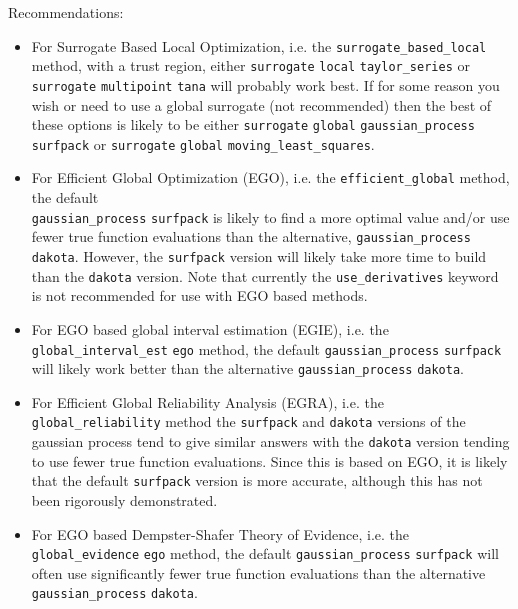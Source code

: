 \newpage
{\large Recommendations:}
\begin{itemize}
\item For Surrogate Based Local Optimization, i.e. the 
      \texttt{surrogate\_based\_local} method, with a trust region, either
      \texttt{surrogate} \texttt{local} \texttt{taylor\_series} or
      \texttt{surrogate} \texttt{multipoint} \texttt{tana} will probably 
      work best.  If for some reason you wish or need to use a global 
      surrogate (not recommended) then the best of these options is likely 
      to be either 
      \texttt{surrogate} \texttt{global} 
      \texttt{gaussian\_process} \texttt{surfpack} or
      \texttt{surrogate} \texttt{global} \texttt{moving\_least\_squares}.
\item For Efficient Global Optimization (EGO), i.e. the 
      \texttt{efficient\_global} method, the default\\
      \texttt{gaussian\_process} \texttt{surfpack}  
      is likely to find a more optimal value and/or use fewer true 
      function evaluations than the alternative,
      \texttt{gaussian\_process} \texttt{dakota}.  However, the 
      \texttt{surfpack} version will likely take more time to build 
      than the \texttt{dakota} version.  Note that currently the 
      \texttt{use\_derivatives} keyword is not recommended for use with
      EGO based methods.
\item For EGO based global interval estimation (EGIE), i.e. the 
      \texttt{global\_interval\_est} \texttt{ego} method, 
      the default \texttt{gaussian\_process} \texttt{surfpack} will
      likely work better than the alternative \texttt{gaussian\_process} 
      \texttt{dakota}.
\item For Efficient Global Reliability Analysis (EGRA), i.e. the 
      \texttt{global\_reliability} method the \texttt{surfpack} and 
      \texttt{dakota} versions of the gaussian process tend to give 
      similar answers with the \texttt{dakota} version tending to use
      fewer true function evaluations.  Since this is based on EGO, it
      is likely that the default \texttt{surfpack} version is more 
      accurate, although this has not been rigorously demonstrated.
\item For EGO based Dempster-Shafer Theory of Evidence, i.e. the 
      \texttt{global\_evidence} \texttt{ego} method, the default
      \texttt{gaussian\_process} \texttt{surfpack} will often use
      significantly fewer true function evaluations than the 
      alternative \texttt{gaussian\_process} \texttt{dakota}.

\end{itemize}
